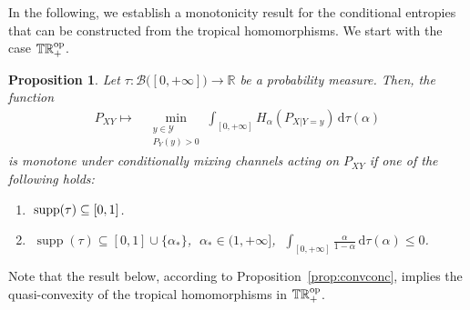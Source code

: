 \documentclass[aps,pra,11pt,onecolumn,nofootinbib,tightenlines]{revtex4-2}
\newtheorem{proposition}[theorem]{Proposition}
\theoremstyle{definition}
\def \d {\mathrm{d}}
\newcommand{\mc}[1]{\mathcal{#1}}
\newcommand{\mb}[1]{\mathbb{#1}}
\begin{document}
In the following, we establish a monotonicity result for the conditional entropies that can be constructed from the tropical homomorphisms. We start with the case $\mb{TR}_+^{\rm op}$.
\begin{proposition}
\label{prop: sufficient tropical}
Let $\tau:\mc B\big([0,+\infty]\big)\to\mb R$ be a probability measure. Then, the function
\begin{align}\label{eq:TropicalForm}
     P_{XY} \longmapsto &\min \limits_{\substack{y \in \mathcal{Y} \\ P_Y( y) > 0}}  \int_{[0,+\infty]} H_\alpha(P_{X|Y=y}) \,\d\tau(\alpha)
\end{align}
is monotone under conditionally mixing channels acting on $P_{XY}$ if one of the following holds:
\begin{enumerate}[label=(\alph*),ref=2(\alph*),itemsep=0pt,topsep=5pt]
    \item  $\;\textup{supp}(\tau) \subseteq [0,1]$.
    \label{it: 1 for tropical}
    \item $\;\operatorname{supp}(\tau) \subseteq [0,1] \cup \{\alpha_*\}$, $\;\alpha_* \in (1, +\infty]$, $\;\displaystyle\int_{[0,+\infty]} \frac{\alpha}{1 - \alpha} \, \mathrm{d}\tau(\alpha) \leq 0$.
    \label{it: 2 for tropical}
\end{enumerate}
\end{proposition}
 Note that the result below, according to Proposition~\ref{prop:convconc}, implies the quasi-convexity of the tropical homomorphisms in $\mb{TR}_+^{\rm op}$.
\end{document}
